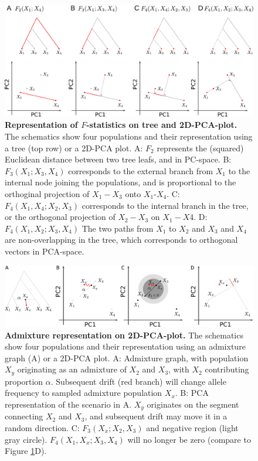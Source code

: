 \documentclass[12pt,fullpage, a4paper]{article}
\begin{document}
\begin{figure}[!ht]
	\includegraphics[width=\textwidth]{figures/fstats_pca_vs_tree.pdf}
	\caption{\textbf{Representation of $F$-statistics on tree and 2D-PCA-plot.} The schematics show four populations and their representation using a tree (top row) or a 2D-PCA plot. A: $F_2$ represents the (squared) Euclidean distance between two tree leafs, and in PC-space. B: $F_3(X_1; X_3, X_4)$ corresponds to the external branch from $X_1$ to the internal node joining the populations, and is proportional to the orthoginal projection of $X_1 - X_3$ onto $X_1$-$X_4$. C: $F_4(X_1, X_4; X_2, X_3)$ corresponds to the internal branch in the tree, or the orthogonal projection of $X_2 - X_3$ on $X_1 - X4$. D: $F_4(X_1, X_2; X_3, X_4)$ The two paths from $X_1$ to $X_2$ and $X_3$ and $X_4$ are non-overlapping in the tree, which corresponds to orthogonal vectors in PCA-space.}
	\label{fig:geom}
\end{figure}

\begin{figure}[!ht]
	\includegraphics[width=\textwidth]{figures/fstats_admixture_pca.pdf}
	\caption{\textbf{Admixture representation on 2D-PCA-plot.} The schematics show four populations and their representation using an admixture graph (A) or a 2D-PCA plot. A: Admixture graph, with population $X_y$ originating as an admixture of $X_2$ and $X_3$, with $X_2$ contributing proportion $\alpha$. Subsequent drift (red branch) will change allele frequency to sampled admixture population $X_x$. B: PCA representation of the scenario in A. $X_y$ originates on the segment connecting $X_2$ and $X_3$, and subsequent drift may move it in a random direction. C: $F_3(X_x; X_2, X_3)$ and negative region (light gray circle). $F_4(X_1, X_x; X_3, X_4)$ will no longer be zero (compare to Figure \ref{fig:geom}D). }
	\label{fig:admix}
\end{figure}
\end{document}
